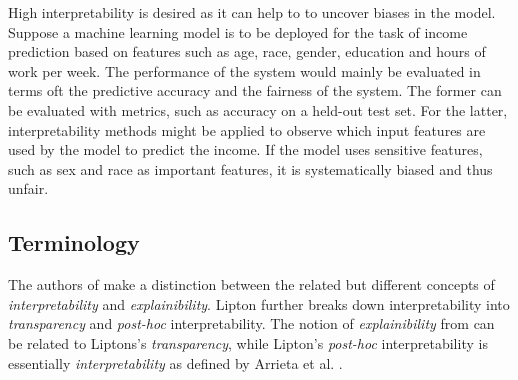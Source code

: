 




High interpretability is desired as it can help to to uncover biases in the model. Suppose a machine learning model is to be deployed for the task of income prediction based on features such as age, race, gender, education and hours of work per week. The performance of the system would mainly be evaluated in terms oft the predictive accuracy and the fairness of the system. The former can be evaluated with metrics, such as accuracy on a held-out test set. For the latter, interpretability methods might be applied to observe which input features are used by the model to predict the income. 
If the model uses sensitive features, such as sex and race as important features, it is systematically biased and thus unfair. 


\subsection{Terminology}
\label{subsec:interpretation_methods_terminology}
The authors of \cite{arrieta2020explainable} make a distinction between the related but different concepts of \textit{interpretability} and \textit{explainibility}. Lipton \cite{lipton2018mythos} further breaks down interpretability into \textit{transparency} and \textit{post-hoc} interpretability. The notion of \textit{explainibility} from \cite{arrieta2020explainable} can be related to Liptons's \textit{transparency}, while Lipton's \textit{post-hoc} interpretability is essentially \textit{interpretability} as defined by Arrieta et al. \cite{arrieta2020explainable}.

